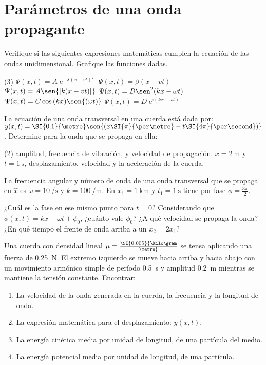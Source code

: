 \section*{Parámetros de una onda propagante}

\item Verifique si las siguientes expresiones matemáticas cumplen la ecuación
de las ondas unidimensional.
Grafique las funciones dadas.
\begin{tasks}(3)
	\task $\Psi(x,t)= A \operatorname{e}^{- \lambda ( x - v t)^2 }$
	\task $\Psi(x,t)= \beta ( x + v t )$
	\task $\Psi(x,t)= A \sen{\left[ k (x - v t) \right] }$
	\task $\Psi(x,t)= B \sen^2{ \left( k x -\omega t \right) }$
	\task $\Psi(x,t)= C \cos{(k x)} \sen{ \left( \omega t \right) }$
	\task $\Psi(x,t)= D \operatorname{e}^{i ( k x - \omega t ) }$
\end{tasks}


\item La ecuación de una onda transversal en una cuerda está dada por: $y(x,t) = \SI{0.1}{\metre} \sen{ \left( x \SI{\pi}{\per\metre} - t \SI{4 \pi}{\per\second} \right) }$.
Determine para la onda que se propaga en ella:
\begin{tasks}(2)
	\task amplitud,
	\task frecuencia de vibración, y
	\task velocidad de propagación.
	\task $x = \SI{2}{\metre}$ y $ t = \SI{1}{\second}$, desplazamiento, velocidad y la aceleración de la cuerda.
\end{tasks}


\item La frecuencia angular y número de onda de una onda transversal que se propaga en $\hat{x}$ es $\omega= \SI{10}{\per\second}$ y $k = \SI{100}{\per\metre}$.
En $x_1 = \SI{1}{\kilo\metre}$ y $t_1 = \SI{1}{\second}$ tiene por fase $\phi = \frac{3 \pi}{2}$.
\begin{tasks}
	\task ¿Cuál es la fase en ese mismo punto para $t = 0$?
	\task Considerando que $\phi(x,t) = k x - \omega t+ \phi_0$, ¿cuánto vale $\phi_0$?
	\task ¿A qué velocidad se propaga la onda?
	\task ¿En qué tiempo el frente de onda arriba a un $x_2 = 2 x_1$?
\end{tasks}


\item Una cuerda con densidad lineal $\mu = \SI{0.005}{\kilo\gram\over\metre}$ se tensa aplicando una fuerza de \SI{0.25}{\newton}.
El extremo izquierdo se mueve hacia arriba y hacia abajo con un movimiento armónico simple de período \SI{0.5}{\second} y amplitud \SI{0.2}{\metre} mientras se mantiene la tensión constante.
Encontrar:
\begin{enumerate}
	\item La velocidad de la onda generada en la cuerda, la frecuencia y la longitud de onda.
	\item La expresión matemática para el desplazamiento: $y(x,t)$.
	\item La energía cinética media por unidad de longitud, de una partícula del medio.
	\item La energía potencial media por unidad de longitud, de una partícula.
\end{enumerate}
